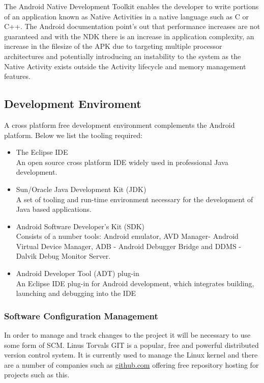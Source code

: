 The Android Native Development Toolkit enables the developer to write portions of an application known as Native Activities in a native language such as C or C++. The Android documentation point's out that performance increases are not guaranteed and with the NDK there is an increase in application complexity, an increase in the filesize of the APK due to targeting multiple processor architectures and potentially introducing an instability to the system as the Native Activity exists outside the Activity lifecycle and memory management features.

\subsection{Development Enviroment}

A cross platform free development environment complements the Android platform.  Below we list the tooling required:

\begin{itemize}
\item The Eclipse IDE\\
An open source cross platform IDE widely used in professional Java development.
\item Sun/Oracle Java Development Kit (JDK)\\
A set of tooling and run-time environment necessary for the development of Java based applications.
\item Android Software Developer's Kit (SDK)\\
Consists of a number tools: Android emulator, AVD Manager- Android Virtual Device Manager, ADB - Android Debugger Bridge and DDMS - Dalvik Debug Monitor Server.
\item Android Developer Tool (ADT) plug-in\\
An Eclipse IDE plug-in for Android development, which integrates building, launching and debugging into the IDE
\end{itemize}

\subsubsection{Software Configuration Management}
In order to manage and track changes to the project it will be necessary to use some form of SCM. Linus Torvals GIT is a popular, free and powerful distributed version control system. It is currently used to manage the Linux kernel and there are a number of companies such as \url{github.com} offering free repository hosting for projects such as this.

